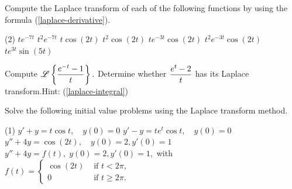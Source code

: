 \begin{Exercise}\label{EX73}
	
	\vspace{-\baselineskip}%
\Question\label{chap7-3-1}	Compute the Laplace transform of each of the following functions by using the formula (\ref{laplace-derivative}).

	\begin{tasks}(2)
		\task $t e^{-7t}$
		\task $t^2 e^{-7t}$
		\task $t\cos(2t)$
		\task $t^2\cos(2t)$
		\task $te^{-3t}\cos(2t)$
		\task $t^2e^{-3t}\cos(2t)$
		\task $t e^{3t}\sin(5t)$
	\end{tasks}
	
	\Question\label{chap7-3-2} Compute  $\displaystyle\mathscr{L}\left\{\frac{e^{-t}-1}{t}\right\}.$
	\Question\label{chap7-3-3} Determine whether  $\displaystyle \frac{e^t-2}{t}$ has its Laplace transform.\newline Hint: (\ref{laplace-integral})

	\Question  Solve the following initial value problems using the Laplace transform method.
	\begin{tasks}[resume=false](1)
			\task $y'+y= t\cos t, \quad y(0) =0$
			\task $y'-y= t e^t\cos t, \quad y(0) =0$
			\task $y''+4y= \cos (2t), \quad y(0) =2, y'(0)= 1$
			\task $y''+4y= f(t),\; y(0) =2, y'(0)= 1,$ with $f(t) =\begin{cases}
				\cos(2t) &\text{ if } t< 2\pi,\\
				0&\text{ if } t\ge 2\pi.
			\end{cases}$
			 
		\end{tasks}
\end{Exercise}


